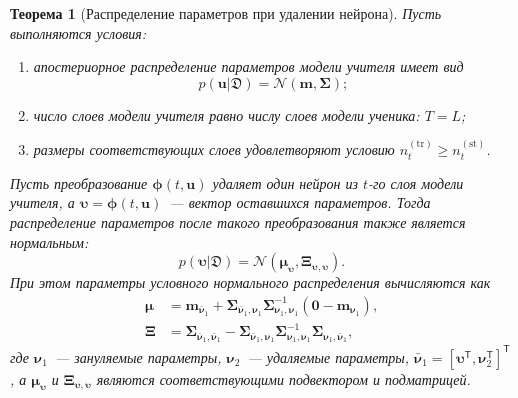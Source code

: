 \documentclass{dissert}
\newtheorem{theorem}{Теорема}
\begin{document}
\begin{theorem}[Распределение параметров при удалении нейрона]
Пусть выполняются условия:
\begin{enumerate}
    \item апостериорное распределение параметров модели учителя имеет вид
    \[
        p(\mathbf{u}|\mathfrak{D})=\mathcal{N}(\mathbf{m},\boldsymbol{\Sigma});
    \]
    \item число слоев модели учителя равно числу слоев модели ученика: $T=L$;
    \item размеры соответствующих слоев удовлетворяют условию $n_t^{(\mathrm{tr})}\ge n_t^{(\mathrm{st})}$.
\end{enumerate}
Пусть преобразование $\boldsymbol{\phi}(t,\mathbf{u})$ удаляет один нейрон из $t$-го слоя модели учителя, а $\boldsymbol{\upsilon}=\boldsymbol{\phi}(t,\mathbf{u})$~--- вектор оставшихся параметров. Тогда распределение параметров после такого преобразования также является нормальным:
\[
    p(\boldsymbol{\upsilon}|\mathfrak{D})
    =
    \mathcal{N}(\boldsymbol{\mu}_{\boldsymbol{\upsilon}},
    \boldsymbol{\Xi}_{\boldsymbol{\upsilon},\boldsymbol{\upsilon}}).
\]
При этом параметры условного нормального распределения вычисляются как
\[
\begin{aligned}
    \boldsymbol{\mu}
    &=
    \mathbf{m}_{\bar{\boldsymbol{\nu}}_1}
    +
    \boldsymbol{\Sigma}_{\bar{\boldsymbol{\nu}}_1,\boldsymbol{\nu}_1}
    \boldsymbol{\Sigma}_{\boldsymbol{\nu}_1,\boldsymbol{\nu}_1}^{-1}
    (\mathbf{0}-\mathbf{m}_{\boldsymbol{\nu}_1}),\\
    \boldsymbol{\Xi}
    &=
    \boldsymbol{\Sigma}_{\bar{\boldsymbol{\nu}}_1,\bar{\boldsymbol{\nu}}_1}
    -
    \boldsymbol{\Sigma}_{\bar{\boldsymbol{\nu}}_1,\boldsymbol{\nu}_1}
    \boldsymbol{\Sigma}_{\boldsymbol{\nu}_1,\boldsymbol{\nu}_1}^{-1}
    \boldsymbol{\Sigma}_{\boldsymbol{\nu}_1,\bar{\boldsymbol{\nu}}_1},
\end{aligned}
\]
где $\boldsymbol{\nu}_1$~--- зануляемые параметры, $\boldsymbol{\nu}_2$~--- удаляемые параметры, $\bar{\boldsymbol{\nu}}_1=[\boldsymbol{\upsilon}^{\mathsf{T}},\boldsymbol{\nu}_2^{\mathsf{T}}]^{\mathsf{T}}$, а $\boldsymbol{\mu}_{\boldsymbol{\upsilon}}$ и $\boldsymbol{\Xi}_{\boldsymbol{\upsilon},\boldsymbol{\upsilon}}$ являются соответствующими подвектором и подматрицей.
\end{theorem}
\end{document}
